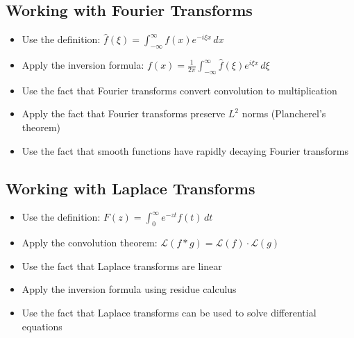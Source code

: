 \subsection*{Working with Fourier Transforms}
\begin{itemize}
\item Use the definition: $\widehat{f}(\xi) = \int_{-\infty}^{\infty} f(x) e^{-i\xi x} \, dx$
\item Apply the inversion formula: $f(x) = \frac{1}{2\pi} \int_{-\infty}^{\infty} \widehat{f}(\xi) e^{i\xi x} \, d\xi$
\item Use the fact that Fourier transforms convert convolution to multiplication
\item Apply the fact that Fourier transforms preserve $L^2$ norms (Plancherel's theorem)
\item Use the fact that smooth functions have rapidly decaying Fourier transforms
\end{itemize}

\subsection*{Working with Laplace Transforms}
\begin{itemize}
\item Use the definition: $F(z) = \int_0^{\infty} e^{-zt} f(t) \, dt$
\item Apply the convolution theorem: $\mathcal{L}(f * g) = \mathcal{L}(f) \cdot \mathcal{L}(g)$
\item Use the fact that Laplace transforms are linear
\item Apply the inversion formula using residue calculus
\item Use the fact that Laplace transforms can be used to solve differential equations
\end{itemize}


